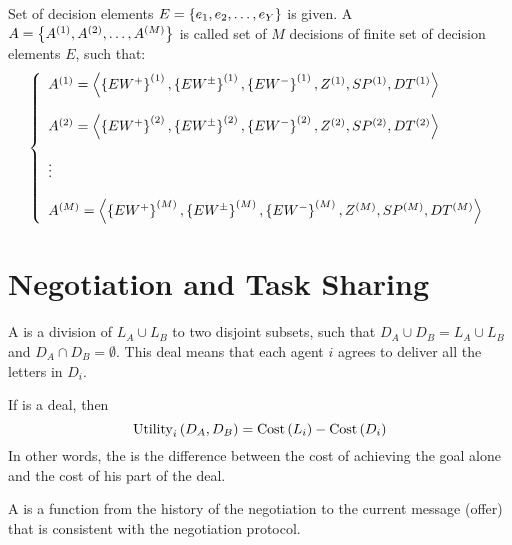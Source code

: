 \begin{defi}[Profile]
Set of decision elements $E=\left\{ e_1,e_2,\ldots,e_Y\right\}$ is given. A  $A=\left\{ A^{(1)},A^{(2)},\ldots,A^{(M)}\right\}$ is called set of $M$ decisions of finite set of decision elements $E$, such that:
\begin{equation}
\left\{\begin{array}{l}
A^{(1)}=\left\langle \left\{ EW^+\right\}^{(1)},\left\{ EW^{\pm}\right\}^{(1)},\left\{ EW^-\right\}^{(1)},Z^{(1)},SP^{(1)},DT^{(1)}\right\rangle\\\\
A^{(2)}=\left\langle \left\{ EW^+\right\}^{(2)},\left\{ EW^{\pm}\right\}^{(2)},\left\{ EW^-\right\}^{(2)},Z^{(2)},SP^{(2)},DT^{(2)}\right\rangle\\\\
\vdots\\\\
A^{(M)}=\left\langle \left\{ EW^+\right\}^{(M)},\left\{ EW^{\pm}\right\}^{(M)},\left\{ EW^-\right\}^{(M)},Z^{(M)},SP^{(M)},DT^{(M)}\right\rangle
\end{array}\right.
\end{equation}
\cite{conf/fedcsis/Sobieska-KarpinskaH12}
\end{defi}

\section{Negotiation and Task Sharing}

\begin{defi}[Deal]
A  is a division of $L_A\cup L_B$ to two disjoint subsets,  such that $D_A\cup D_B=L_A\cup L_B$ and $D_A\cap D_B=\emptyset$. This deal means that each agent $i$ agrees to deliver all the letters in $D_i$.
\cite{conf/ijcai/ZlotkinR89}
\end{defi}

\begin{defi}
If  is a deal, then
\begin{equation}
\mbox{Utility}_i\left(D_A,D_B\right)=\mbox{Cost}\left(L_i\right)-\mbox{Cost}\left(D_i\right)
\end{equation}
In other words, the  is the difference between the cost of achieving the goal alone and the cost of his part of the deal.
\cite{conf/ijcai/ZlotkinR89}
\end{defi}

\begin{defi}
A  is a function from the history of the negotiation to the current message (offer) that is consistent with the negotiation protocol.
\cite{conf/ijcai/ZlotkinR89}
\end{defi}

